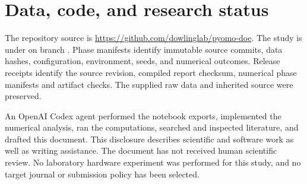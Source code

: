 \section{Data, code, and research status}
The repository source is \url{https://github.com/dowlinglab/pyomo-doe}.
The study is under  on branch
. Phase manifests identify immutable source
commits, data hashes, configuration, environment, seeds, and numerical outcomes.
Release receipts identify the source revision, compiled report checksum, numerical phase manifests and artifact checks. The supplied raw data and inherited source were preserved.

An OpenAI Codex agent performed the notebook exports, implemented the numerical
analysis, ran the computations, searched and inspected literature, and drafted
this document. This disclosure describes scientific and software work as well
as writing assistance. The document has not received human scientific review.
No laboratory hardware experiment was performed for this study, and no target
journal or submission policy has been selected.
